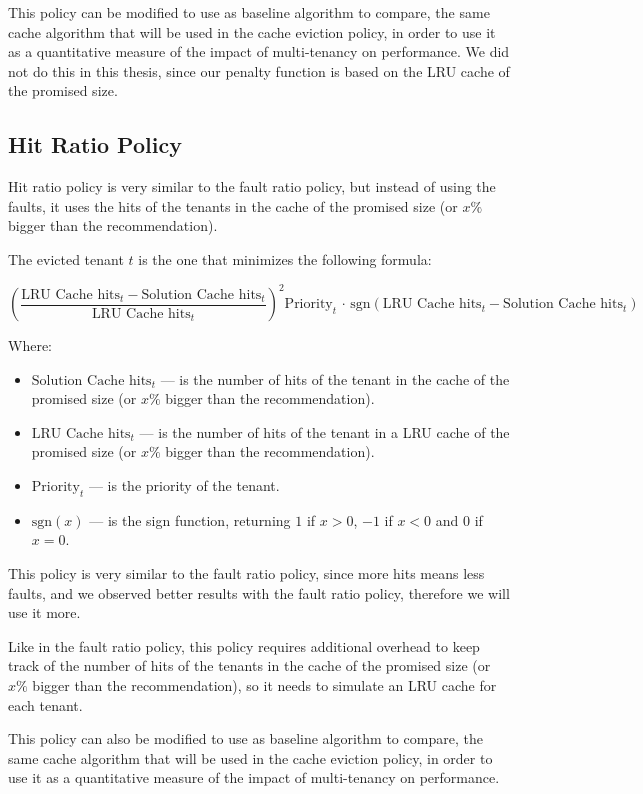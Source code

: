 This policy can be modified to use as baseline algorithm to compare, the same cache algorithm
that will be used in the cache eviction policy, in order to use it as a quantitative measure 
of the impact of multi-tenancy on performance. We did not do this in this thesis, since
our penalty function is based on the LRU cache of the promised size.

\subsection{Hit Ratio Policy}

Hit ratio policy is very similar to the fault ratio policy, but instead of using the faults,
it uses the hits of the tenants in the cache of the promised size (or $x\%$ bigger than the recommendation).

The evicted tenant $t$ is the one that minimizes the following formula:

$$
\left( \frac{\text{LRU Cache hits}_t - \text{Solution Cache hits}_t}{\text{LRU Cache hits}_t} \right) ^2 \text{Priority}_t \, \cdot \, \text{sgn}( \text{LRU Cache hits}_t - \text{Solution Cache hits}_t )
$$

Where:

\begin{itemize}
    \item $\text{Solution Cache hits}_t$ --- is the number of hits of the tenant in the cache of the promised size (or $x\%$ bigger than the recommendation).
    \item $\text{LRU Cache hits}_t$ --- is the number of hits of the tenant in a LRU cache of the promised size (or $x\%$ bigger than the recommendation).
    \item $\text{Priority}_t$ --- is the priority of the tenant.
    \item $\text{sgn}(x)$ --- is the sign function, returning $1$ if $x > 0$, $-1$ if $x < 0$ and $0$ if $x = 0$.
\end{itemize}

This policy is very similar to the fault ratio policy, since more hits means less faults,
and we observed better results with the fault ratio policy, therefore we will use it more.

Like in the fault ratio policy, this policy requires additional overhead to keep track of the
number of hits of the tenants in the cache of the promised size (or $x\%$ bigger than the recommendation),
so it needs to simulate an LRU cache for each tenant.

This policy can also be modified to use as baseline algorithm to compare, the same cache algorithm
that will be used in the cache eviction policy, in order to use it as a quantitative measure
of the impact of multi-tenancy on performance.

